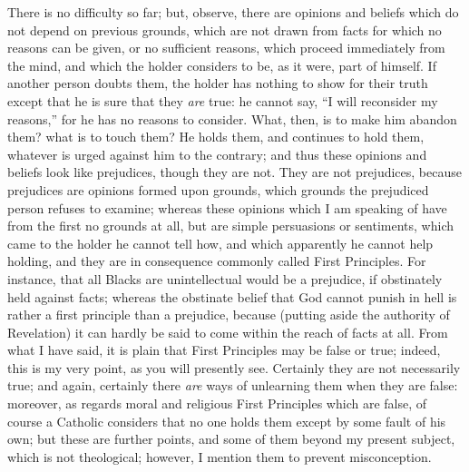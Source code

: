 There is no difficulty so far; but, observe, there are
opinions and beliefs which do not depend on previous
grounds, which are not drawn from facts for which no
reasons can be given, or no sufficient reasons, which
proceed immediately from the mind, and which the holder
considers to be, as it were, part of himself. If another
person doubts them, the holder has nothing to show for
their truth except that he is sure that they \emph{are}
true: he cannot say, ``I will reconsider my
reasons,'' for he has no reasons to consider. What,
then, is to make him abandon them? what is to touch them?
He holds them, and continues to hold them, whatever is
urged against him to the contrary; and thus these
opinions and beliefs look like prejudices, though they
are not. They are not prejudices, because prejudices are
opinions formed upon grounds, which grounds the
prejudiced person refuses to examine; whereas these
opinions which I am speaking of have from the first no
grounds at all, but are simple persuasions or sentiments,
which came to the holder he cannot tell how, and which
apparently he cannot help holding, and they are in
consequence commonly called First Principles. For
instance, that all Blacks are unintellectual would be a
prejudice, if obstinately held against facts; whereas the
obstinate belief that God cannot punish in hell is rather
a first principle than a prejudice, because (putting
aside the authority of Revelation) it can hardly be said
to come within the reach of facts at all. From what I
have said, it is plain that First Principles may be false
or true; indeed, this is my very point, as you will
presently see. Certainly they are not necessarily true;
and again, certainly there \emph{are} ways of
unlearning them when they are false: moreover, as regards
moral and religious First Principles which are false, of
course a Catholic considers that no one holds them except
by some fault of his own; but these are further points,
and some of them beyond my present subject, which is not
theological; however, I mention them to prevent
misconception.

